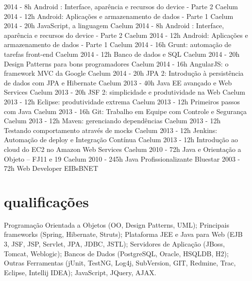 \begin{entrylistii}
  \entryii
    {2014 - 8h}
    {Android : Interface, aparência e recursos do device - Parte 2}
    {Caelum}
  \entryii
    {2014 - 12h}
    {Android: Aplicações e armazenamento de dados - Parte 1}
    {Caelum}    
  \entryii
    {2014 - 20h}
    {JavaScript, a linguagem}
    {Caelum}  
  \entryii
    {2014 - 8h}
    {Android : Interface, aparência e recursos do device - Parte 2}
    {Caelum}  
  \entryii
    {2014 - 12h}
    {Android: Aplicações e armazenamento de dados - Parte 1}
    {Caelum}  
  \entryii
    {2014 - 16h}
    {Grunt: automação de tarefas front-end}
    {Caelum}  
  \entryii
    {2014 - 12h}
    {Banco de dados e SQL}
    {Caelum}  
  \entryii
    {2014 - 20h}
    {Design Patterns para bons programadores}
    {Caelum}  
  \entryii
    {2014 - 16h}
    {AngularJS: o framework MVC da Google}
    {Caelum}
  \entryii
    {2014 - 20h}
    {JPA 2: Introdução à persistência de dados com JPA e Hibernate}
    {Caelum}
  \entryii
    {2013 - 40h}
    {Java EE avançado e Web Services}
    {Caelum}
  \entryii
    {2013 - 20h}
    {JSF 2: simplicidade e produtividade na Web}
    {Caelum}
  \entryii
    {2013 - 12h}
    {Eclipse: produtividade extrema}
    {Caelum}
  \entryii
    {2013 - 12h}
    {Primeiros passos com Java}
    {Caelum}
  \entryii
    {2013 - 16h}
    {Git: Trabalho em Equipe com Controle e Segurança}
    {Caelum}
  \entryii
    {2013 - 12h}
    {Maven: gerenciando dependências}
    {Caelum}
  \entryii
    {2013 - 12h}
    {Testando comportamento através de mocks}
    {Caelum}
  \entryii
    {2013 - 12h}
    {Jenkins: Automação de deploy e Integração Contínua}
    {Caelum}
  \entryii
    {2013 - 12h}
    {Introdução ao cloud do EC2 no Amazon Web Services}
    {Caelum}
  \entryii
    {2010 - 72h}
    {Java e Orientação a Objeto – FJ11 e 19}
    {Caelum}
  \entryii
    {2010 - 245h}
    {Java Profissionalizante}
    {Bluestar}
  \entryii
    {2003 - 72h}
    {Web Developer}
    {EIBsBNET}
\end{entrylistii}

\newpage

\section{qualificações}

Programação Orientada a Objetos (OO, Design Patterns, UML); Principais frameworks (Spring, Hibernate, Struts); Plataforma JEE e Java para Web (EJB 3, JSF, JSP, Servlet, JPA, JDBC, JSTL); Servidores de Aplicação (JBoss, Tomcat, Weblogic); Bancos de Dados (PostgreSQL, Oracle, HSQLDB, H2); Outras Ferramentas (jUnit, TestNG, Log4j, SubVersion, GIT, Redmine, Trac, Eclipse, Intellij IDEA); JavaScript, JQuery, AJAX.

